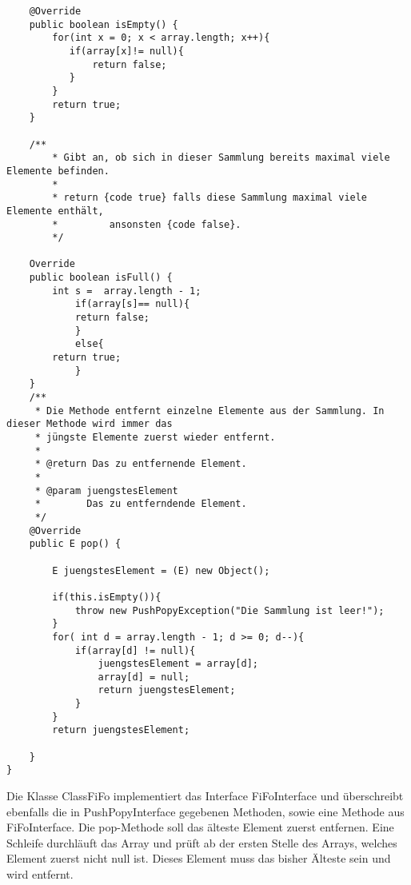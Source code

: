 \documentclass{pi2}
\begin{document}
\begin{lstlisting}
	@Override
	public boolean isEmpty() {
		for(int x = 0; x < array.length; x++){
		   if(array[x]!= null){
			   return false;
		   }
		}
		return true;
	}

	/**
	    * Gibt an, ob sich in dieser Sammlung bereits maximal viele Elemente befinden.
	    *
	    * return {code true} falls diese Sammlung maximal viele Elemente enthält,
	    *         ansonsten {code false}.
	    */
	
	Override
	public boolean isFull() {
		int s =  array.length - 1;
			if(array[s]== null){
			return false;
			}
			else{
		return true;
			}
	}
    /**
     * Die Methode entfernt einzelne Elemente aus der Sammlung. In dieser Methode wird immer das 
     * jüngste Elemente zuerst wieder entfernt.
     * 
     * @return Das zu entfernende Element.
     * 
     * @param juengstesElement 
     *        Das zu entferndende Element.
     */
	@Override
	public E pop() {
		
		E juengstesElement = (E) new Object();
		
	    if(this.isEmpty()){
	    	throw new PushPopyException("Die Sammlung ist leer!");
	    }
	    for( int d = array.length - 1; d >= 0; d--){
	    	if(array[d] != null){
	    		juengstesElement = array[d];
	    		array[d] = null;
	    		return juengstesElement;
	    	}
		}
	    return juengstesElement;
	
	}
}

\end{lstlisting}

Die Klasse ClassFiFo implementiert das Interface FiFoInterface und überschreibt ebenfalls die in PushPopyInterface gegebenen Methoden, sowie eine Methode aus FiFoInterface. Die pop-Methode soll das älteste Element zuerst entfernen. Eine Schleife durchläuft das Array und prüft ab der ersten Stelle des Arrays, welches Element zuerst nicht null ist. Dieses Element muss das bisher Älteste sein und wird entfernt. 
\end{document}
